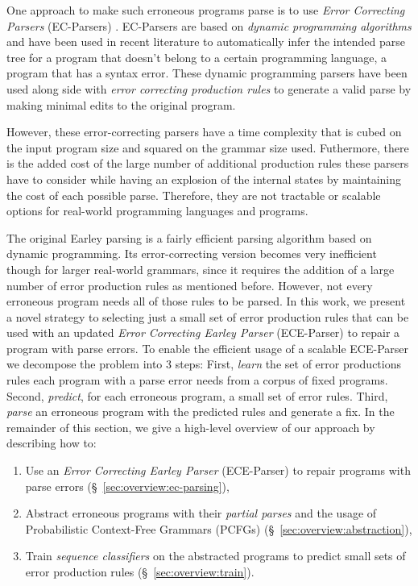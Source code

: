 One approach to make such erroneous programs parse is to use \emph{Error
Correcting Parsers} (EC-Parsers) \citep{Aho_1972}. EC-Parsers are based on
\emph{dynamic programming algorithms} and have been used in recent literature to
automatically infer the intended parse tree for a program that doesn't belong to
a certain programming language, \ie a program that has a syntax error. These
dynamic programming parsers have been used along side with \emph{error
correcting production rules} \citep{Aho_1972} to generate a valid parse by
making minimal edits to the original program.

However, these error-correcting parsers have a time complexity that is cubed on
the input program size and squared on the grammar size used. Futhermore, there
is the added cost of the large number of additional production rules these
parsers have to consider while having an explosion of the internal states by
maintaining the cost of each possible parse. Therefore, they are not tractable
or scalable options for real-world programming languages and programs.


The original Earley parsing is a fairly efficient parsing algorithm
\citep{Earley_1970} based on dynamic programming. Its error-correcting version
becomes very inefficient though for larger real-world grammars, since it
requires the addition of a large number of error production rules as mentioned
before. However, not every erroneous program needs all of those rules to be
parsed. In this work, we present a novel strategy to selecting just a small set
of error production rules that can be used with an updated \emph{Error
Correcting Earley Parser} (ECE-Parser) to repair a program with parse errors.
%
To enable the efficient usage of a scalable ECE-Parser we decompose the problem into 3
steps:
%
First, \emph{learn} the set of error productions rules each program with a parse
error needs from a corpus of fixed programs.
%
Second, \emph{predict}, for each erroneous program, a small set of error rules.
%
Third, \emph{parse} an erroneous program with the predicted rules and generate a
fix.
%
In the remainder of this section, we give a high-level overview
of our approach by describing how to:

\begin{enumerate}

  \item Use an \emph{Error Correcting Earley Parser} (ECE-Parser) to repair programs
  with parse errors (\S~\ref{sec:overview:ec-parsing}),

  \item Abstract erroneous programs with their \emph{partial parses} and the
  usage of Probabilistic Context-Free Grammars (PCFGs)
  (\S~\ref{sec:overview:abstraction}),

  \item Train \emph{sequence classifiers} on the abstracted programs to predict
  small sets of error production rules (\S~\ref{sec:overview:train}).

\end{enumerate}

